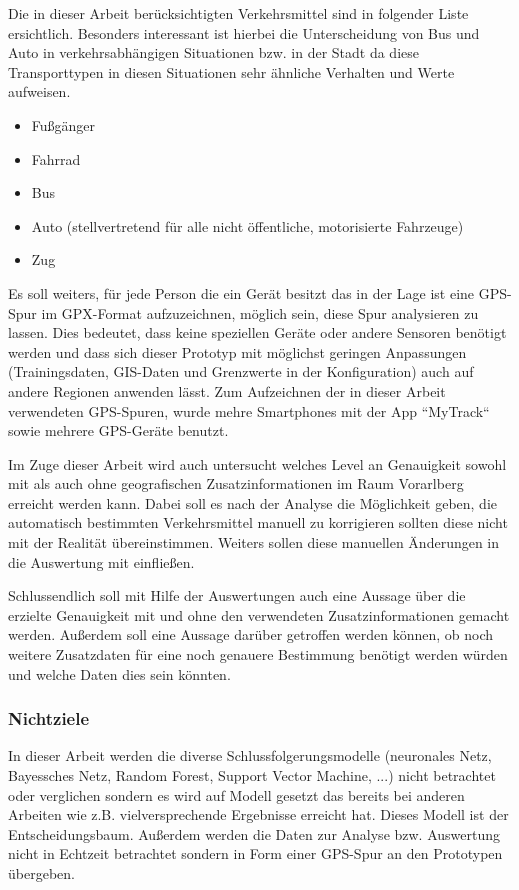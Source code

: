 Die in dieser Arbeit berücksichtigten Verkehrsmittel sind in folgender Liste ersichtlich. Besonders interessant ist hierbei die Unterscheidung von Bus und Auto in verkehrsabhängigen Situationen bzw. in der Stadt da diese Transporttypen in diesen Situationen sehr ähnliche Verhalten und Werte aufweisen. 

\begin{itemize}
\item Fußgänger
\item Fahrrad
\item Bus
\item Auto (stellvertretend für alle nicht öffentliche, motorisierte Fahrzeuge)
\item Zug
\end{itemize}

Es soll weiters, für jede Person die ein Gerät besitzt das in der Lage ist eine GPS-Spur im GPX-Format aufzuzeichnen, möglich sein, diese Spur analysieren zu lassen. Dies bedeutet, dass keine speziellen Geräte oder andere Sensoren benötigt werden und dass sich dieser Prototyp mit möglichst geringen Anpassungen (Trainingsdaten, GIS-Daten und Grenzwerte in der Konfiguration) auch auf andere Regionen anwenden lässt. Zum Aufzeichnen der in dieser Arbeit verwendeten GPS-Spuren, wurde mehre Smartphones mit der App ``MyTrack`` sowie mehrere GPS-Geräte benutzt.

Im Zuge dieser Arbeit wird auch untersucht welches Level an Genauigkeit sowohl mit als auch ohne geografischen Zusatzinformationen im Raum Vorarlberg erreicht werden kann. Dabei soll es nach der Analyse die Möglichkeit geben, die automatisch bestimmten Verkehrsmittel manuell zu korrigieren sollten diese nicht mit der Realität übereinstimmen. Weiters sollen diese manuellen Änderungen in die Auswertung mit einfließen. 

Schlussendlich soll mit Hilfe der Auswertungen auch eine Aussage über die erzielte Genauigkeit mit und ohne den verwendeten Zusatzinformationen gemacht werden. Außerdem soll eine Aussage darüber getroffen werden können, ob noch weitere Zusatzdaten für eine noch genauere Bestimmung benötigt werden würden und welche Daten dies sein könnten. 

\subsubsection{Nichtziele}

In dieser Arbeit werden die diverse Schlussfolgerungsmodelle (neuronales Netz, Bayessches Netz, Random Forest, Support Vector Machine, ...) nicht betrachtet oder verglichen sondern es wird auf Modell gesetzt das bereits bei anderen Arbeiten wie z.B. \cite{stenneth_transportation_2011, reddy_using_2010, sebastian_nagel_moglichkeitsstudie_2011,zheng_learning_2008} vielversprechende Ergebnisse erreicht hat. Dieses Modell ist der Entscheidungsbaum. Außerdem werden die Daten zur Analyse bzw. Auswertung nicht in Echtzeit betrachtet sondern in Form einer GPS-Spur an den Prototypen übergeben.


